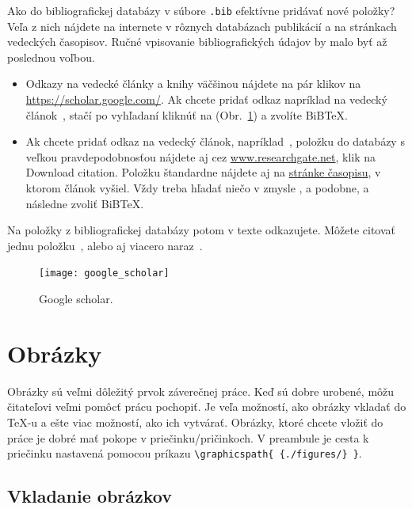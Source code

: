 Ako do bibliografickej databázy v súbore \verb|.bib| efektívne pridávať nové položky? Veľa z nich nájdete na internete v rôznych databázach publikácií a na stránkach vedeckých časopisov. Ručné vpisovanie bibliografických údajov by malo byť až poslednou voľbou.
\begin{itemize}
	\item Odkazy na vedecké články a knihy väčšinou nájdete na pár klikov na \url{https://scholar.google.com/}. Ak chcete pridať odkaz napríklad na vedecký článok~\cite{mikulaRemesikovaSarkoci2014}, stačí po vyhľadaní kliknúť na  (Obr.~\ref{fig:google_scholar}) a zvolíte BiBTeX.
	\item Ak chcete pridať odkaz na vedecký článok, napríklad~\cite{mikulaRemesikovaSarkoci2014}, položku do databázy s veľkou pravdepodobnosťou nájdete aj cez \href{https://www.researchgate.net/publication/275063142_Manifold_Evolution_with_Tangential_Redistribution_of_Points}{www.researchgate.net}, klik na Download citation. Položku štandardne nájdete aj na \href{https://epubs.siam.org/doi/10.1137/130927668}{stránke časopisu}, v ktorom článok vyšiel. Vždy treba hľadať niečo v zmysle ,  a podobne, a následne zvoliť BiBTeX.
\end{itemize}

Na položky z bibliografickej databázy potom v texte odkazujete. Môžete citovať jednu položku~\cite{eymard}, alebo aj viacero naraz~\cite{Handlovicova,mikulaRemesikovaSarkoci2014}.

\begin{figure}[h]
	\centering
	\texttt{[image: google\_scholar]}
	\caption{Google scholar.}
	\label{fig:google_scholar}
\end{figure} 

\section{Obrázky}
Obrázky sú veľmi dôležitý prvok záverečnej práce. Keď sú dobre urobené, môžu čitateľovi veľmi pomôcť prácu pochopiť. Je veľa možností, ako obrázky vkladať do TeX-u a ešte viac možností, ako ich vytvárať. Obrázky, ktoré chcete vložiť do práce je dobré mať pokope v priečinku/pričinkoch. V preambule je cesta k priečinku nastavená pomocou príkazu \verb|\graphicspath{ {./figures/} }|.

\subsection{Vkladanie obrázkov}\label{sec:vkladanie_obrazkov}

